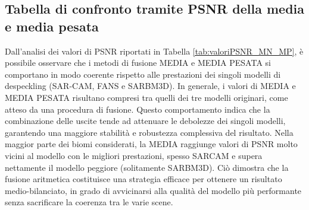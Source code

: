 \subsection{Tabella di confronto tramite PSNR della media e media pesata}
\begin{table}[H] %
  \centering
  \caption{Confronto dei modelli di despeckling e della loro fusione. 
            I valori sopra, indicano la media del PSNR di 100 immagini rappresentanti diversi biomi.
            Ogni modello per la previsione della qualità, usato in MEDIA PESATA, 
            è stato allenato per 10 epoche con un dataset da 30'000 
            immagini. }
  \label{tab:valoriPSNR_MN_MP}
\end{table}    
Dall’analisi dei valori di PSNR riportati in Tabella \ref{tab:valoriPSNR_MN_MP}, è possibile osservare che i metodi di fusione 
MEDIA e MEDIA PESATA si comportano in modo coerente rispetto alle prestazioni dei singoli modelli di despeckling (SAR-CAM, FANS e SARBM3D). 
In generale, i valori di MEDIA e MEDIA PESATA risultano compresi tra quelli dei tre modelli originari, come atteso da una procedura di 
fusione. Questo comportamento indica che la combinazione delle uscite tende ad attenuare le debolezze dei singoli modelli, garantendo una 
maggiore stabilità e robustezza complessiva del risultato.
Nella maggior parte dei biomi considerati, la MEDIA raggiunge valori di PSNR molto vicini al modello con le migliori prestazioni, spesso SARCAM e 
supera nettamente il modello peggiore (solitamente SARBM3D). Ciò dimostra che la fusione aritmetica costituisce una strategia efficace per 
ottenere un risultato medio-bilanciato, in grado di avvicinarsi alla qualità del modello più performante senza sacrificare la coerenza tra le varie scene.
